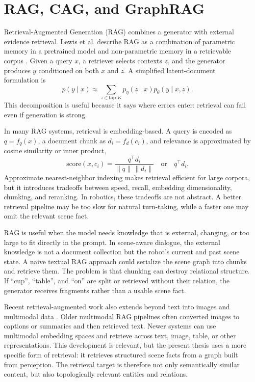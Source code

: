 \section{RAG, CAG, and GraphRAG}\label{sec:rag-cag-graphrag}

Retrieval-Augmented Generation (RAG) combines a generator with external evidence retrieval. Lewis et al. describe RAG as a combination of parametric memory in a pretrained model and non-parametric memory in a retrievable corpus \cite{lewis_retrieval-augmented_2020}. Given a query \(x\), a retriever selects contexts \(z\), and the generator produces \(y\) conditioned on both \(x\) and \(z\). A simplified latent-document formulation is
\[
p(y\mid x)\approx \sum_{z\in \mathrm{top}\text{-}K}p_\eta(z\mid x)p_\theta(y\mid x,z).
\]
This decomposition is useful because it says where errors enter: retrieval can fail even if generation is strong.

In many RAG systems, retrieval is embedding-based. A query is encoded as \(q=f_q(x)\), a document chunk as \(d_i=f_d(c_i)\), and relevance is approximated by cosine similarity or inner product,
\[
\mathrm{score}(x,c_i)=\frac{q^\top d_i}{\|q\|\,\|d_i\|}\quad\text{or}\quad q^\top d_i.
\]
Approximate nearest-neighbor indexing makes retrieval efficient for large corpora, but it introduces tradeoffs between speed, recall, embedding dimensionality, chunking, and reranking. In robotics, these tradeoffs are not abstract. A better retrieval pipeline may be too slow for natural turn-taking, while a faster one may omit the relevant scene fact.

RAG is useful when the model needs knowledge that is external, changing, or too large to fit directly in the prompt. In scene-aware dialogue, the external knowledge is not a document collection but the robot's current and past scene state. A naive textual RAG approach could serialize the scene graph into chunks and retrieve them. The problem is that chunking can destroy relational structure. If \enquote{cup}, \enquote{table}, and \enquote{on} are split or retrieved without their relation, the generator receives fragments rather than a usable scene fact.

Recent retrieval-augmented work also extends beyond text into images and multimodal data \cite{zheng_retrieval_2025}. Older multimodal RAG pipelines often converted images to captions or summaries and then retrieved text. Newer systems can use multimodal embedding spaces and retrieve across text, image, table, or other representations. This development is relevant, but the present thesis uses a more specific form of retrieval: it retrieves structured scene facts from a graph built from perception. The retrieval target is therefore not only semantically similar content, but also topologically relevant entities and relations.

